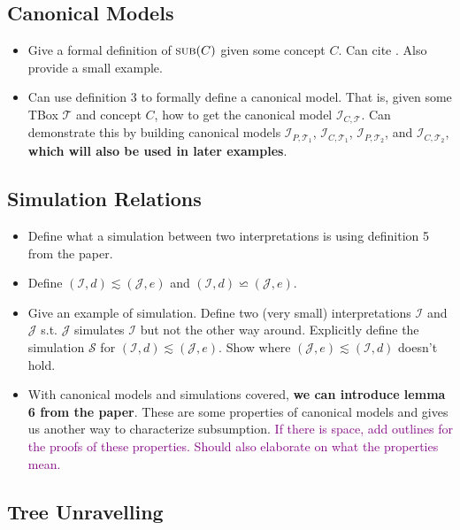 \documentclass[a4paper,USenglish,cleveref,autoref,thm-restate]{lipics-v2021}
\newcommand{\interpretation}{\mathcal{I}}
\newcommand{\I}{\mathcal{I}}
\newcommand{\J}{\mathcal{J}}
\newcommand{\TBox}{\mathcal{T}}
\newcommand{\subconcept}[1]{\textsc{sub}(#1)}
\newcommand{\canonical}[2]{\interpretation_{#1, #2}}
\newcommand{\simulates}[4]{(#1, #2) \lesssim (#3, #4) }
\newcommand{\bisimulates}[4]{(#1, #2) \backsimeq (#3, #4) }
\begin{document}
\subsection{Canonical Models}
    
    \begin{itemize}
        \item Give a formal definition of $\subconcept{C}$ given some concept $C$. Can cite \cite{Baader_Horrocks_Lutz_Sattler_2017}.
        Also provide a small example. 
        \item Can use definition 3 to formally define a canonical model. That is, 
        given some TBox $\TBox$ and concept $C$, how to get the canonical model 
        $\canonical{C}{\TBox}$. Can demonstrate this by building canonical models 
        $\canonical{P}{\TBox_1}$, $\canonical{C}{\TBox_1}$, $\canonical{P}{\TBox_2}$, and 
        $\canonical{C}{\TBox_2}$, \textbf{which will also be used in later examples}. 
    \end{itemize}

\subsection{Simulation Relations}
    
    \begin{itemize}
        \item Define what a simulation between two interpretations is 
        using definition 5 from the paper. 
        \item Define $\simulates{\I}{d}{\J}{e}$ and $\bisimulates{\I}{d}{\J}{e}$. 
        \item Give an example of simulation. Define two (very small) interpretations $\I$ and $\J$ 
        s.t. $\J$ simulates $\I$ but not the other way around. Explicitly define the simulation
        $\mathcal{S}$ for $\simulates{\I}{d}{\J}{e}$. Show where $\simulates{\J}{e}{\I}{d}$
        doesn't hold. 
        \item With canonical models and simulations covered, \textbf{we can introduce lemma 6 from the paper}.
        These are some properties of canonical models and gives us another way to characterize 
        subsumption. \textcolor{purple}{If there is space, add outlines for the proofs of these properties. 
        Should also elaborate on what the properties mean.} 
    \end{itemize}

\subsection{Tree Unravelling}
    
\end{document}
